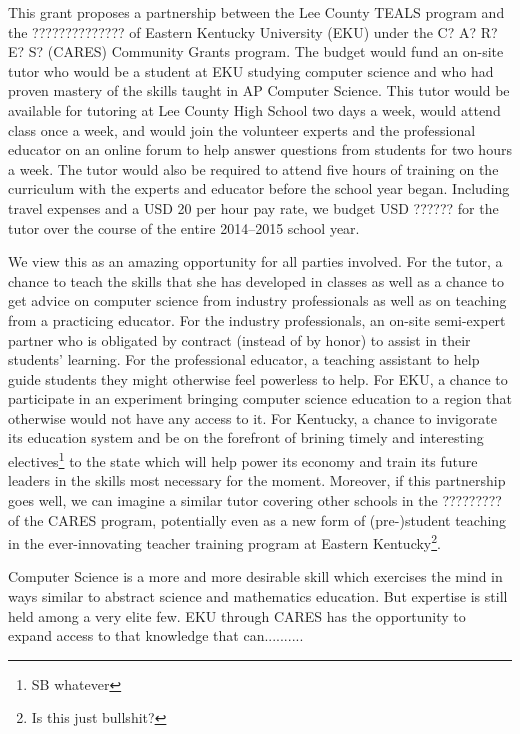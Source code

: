 This grant proposes a partnership between the Lee County TEALS program and
the ?????????????? of Eastern Kentucky University (EKU) under the C? A? R? E? S?
(CARES) Community Grants program. The budget would fund an on-site tutor who
would be a student at EKU studying computer science and who had proven mastery
of the skills taught in AP Computer Science. This tutor would be available for
tutoring at Lee County High School two days a week, would attend class once a
week, and would join the volunteer experts and the professional educator on an
online forum to help answer questions from students for two hours a week.
The tutor would also be required to attend five hours of training on the
curriculum with the experts and educator before the school year began. Including
travel expenses and a USD 20 per hour pay rate, we budget USD ?????? for the
tutor over the course of the entire 2014--2015 school year.

We view this as an amazing opportunity for all parties involved. For the tutor,
a chance to teach the skills that she has developed in classes as well as a
chance to get advice on computer science from industry professionals as well as
on teaching from a practicing educator. For the industry professionals, an
on-site semi-expert partner who is obligated by contract (instead of by honor) to
assist in their students' learning. For the professional educator, a teaching
assistant to help guide students they might otherwise feel powerless to help.
For EKU, a chance to participate in an experiment bringing computer science
education to a region that otherwise would not have any access to it. For
Kentucky, a chance to invigorate its education system and be on the forefront
of brining timely and interesting electives\footnote{SB whatever} to the state
which will help power its economy and train its future leaders in the skills
most necessary for the moment. Moreover, if this partnership goes well, we
can imagine a similar tutor covering other schools in the ????????? of the
CARES program, potentially even as a new form of (pre-)student teaching in the
ever-innovating teacher training program at Eastern Kentucky\footnote{Is this
just bullshit?}.

Computer Science is a more and more desirable skill which exercises the mind
in ways similar to abstract science and mathematics education. But expertise is
still held among a very elite few. EKU through CARES has the opportunity to
expand access to that knowledge that can..........
